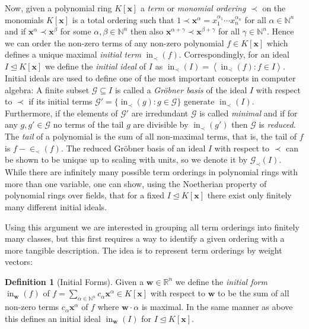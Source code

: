 \documentclass[
  paper=a4,
  titlepage,
  bibliography=totoc,
  pagesize=pdftex
]{scrartcl}
\numberwithin{figure}{section}
\numberwithin{equation}{section}
\numberwithin{table}{section}
\newcommand*\setR{\mathds{R}}
\newcommand*\setN{\mathds{N}}
\newcommand*\ideal[1]{\left\langle #1 \right\rangle}
\let\vec\mathbf
\let\idealof\trianglelefteq
\DeclareMathOperator{\initial}{in}
\theoremstyle{definition}
\newtheorem{definition}{Definition}
\numberwithin{definition}{section}
\begin{document}
Now, given a polynomial ring $K[\vec x]$ a \emph{term} or \emph{monomial ordering} $\prec$
on the monomials $K[\vec x]$ is a total ordering such that $1 \prec \vec x^\alpha =
x_1^{\alpha_1}\cdots x_n^{\alpha_n}$ for all $\alpha \in \setN^n$ and if $\vec x^\alpha
\prec \vec x^\beta$ for some $\alpha, \beta \in \setN^n$ then also $\vec x^{\alpha+\gamma}
\prec \vec x^{\beta+\gamma}$ for all $\gamma \in \setN^n$. Hence we can order the non-zero
terms of any non-zero polynomial $f \in K[\vec x]$ which defines a unique maximal
\emph{initial term} $\initial_\prec(f)$. Correspondingly, for an ideal $I \idealof K[\vec
x]$ we define the \emph{initial ideal} of $I$ as $\initial_\prec(I) =
\ideal{\initial_\prec(f) : f \in I}$. Initial ideals are used to define one of the most
important concepts in computer algebra: A finite subset $\mathcal G \subseteq I$ is called
a \emph{Gröbner basis} of the ideal $I$ with respect to $\prec$ if its initial terms
$\mathcal G' = \{ \initial_\prec(g) : g \in \mathcal G \}$ generate $\initial_\prec(I)$.
Furthermore, if the elements of $\mathcal G'$ are irredundant $\mathcal G$ is called
\emph{minimal} and if for any $g, g' \in \mathcal G$ no terms of the tail $g$ are
divisible by $\initial_\prec(g')$ then $\mathcal G$ is \emph{reduced}. The \emph{tail} of
a polynomial is the sum of all non-maximal terms, that is, the tail of $f$ is
$f-\in_{\prec}(f)$. The reduced Gröbner basis of an ideal $I$ with respect to $\prec$ can
be shown to be unique up to scaling with units, so we denote it by $\mathcal G_\prec(I)$.
While there are infinitely many possible term orderings in polynomial rings with more than
one variable, one can show, using the Noetherian property of polynomial rings over fields,
that for a fixed $I \idealof K[\vec x]$ there exist only finitely many different initial
ideals.

Using this argument we are interested in grouping all term orderings into finitely many
classes, but this first requires a way to identify a given ordering with a more tangible
description. The idea is to represent term orderings by weight vectors:

\begin{definition}[Initial Forms]
  \label{def:initFormG}
  Given a $\vec w \in \setR^n$ we define the \emph{initial form} $\initial_{\vec w}(f)$ of
  $f = \sum_{\alpha\in\setN^n} c_\alpha \vec x^\alpha \in K[\vec x]$ with respect to $\vec
  w$ to be the sum of all non-zero terms $c_\alpha \vec x^\alpha$ of $f$ where $\vec
  w\cdot \alpha$ is maximal. In the same manner as above this defines an initial ideal
  $\initial_{\vec w}(I)$ for $I \idealof K[\vec x]$.
\end{definition}
\end{document}
